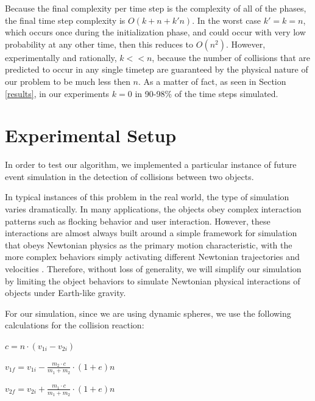 \documentclass[CEJCS,PDF]{cej} %
\begin{document}
Because the final complexity per time step is the complexity of all of the phases, the final time step complexity is $O(k+n+k'n)$.  In the worst case $k'=k=n$, which occurs once during the initialization phase, and could occur with 
very low probability at any other time, then this reduces to $O(n^2)$.  However, experimentally and rationally, $k << n$, because the number of collisions
that are predicted to occur in any single timetep are guaranteed by the physical nature of our problem to be much less then $n$.  As a matter of fact, as seen in Section \ref{results}, in our experiments
$k=0$ in 90-98\% of the time steps simulated.

\section{Experimental Setup}%

In order to test our algorithm, we implemented a particular instance of future event simulation in the detection of collisions between two objects.

In typical instances of this problem in the real world, the type of simulation varies dramatically. In many applications, the objects obey complex interaction patterns such as flocking behavior and user interaction.  However, these interactions are almost always built around a simple framework for simulation that obeys Newtonian physics as the primary motion characteristic, with the more complex
behaviors simply activating different Newtonian trajectories and velocities \cite{Jadbabaie02coordinationof}.  Therefore, without loss of generality, we will simplify our simulation by limiting the object behaviors to simulate Newtonian physical interactions of objects under Earth-like gravity.

For our simulation, since we are using dynamic spheres, we use the following calculations for the collision reaction\cite{wheatchex}:

\begin{math}
c = n \cdot (v_{1i} - v_{2i})
\end{math}

\begin{math}
v_{1f} = v_{1i} - \frac{m_2 \cdot c}{m_1 + m_2} \cdot (1 + e)n
\end{math}

\begin{math}
v_{2f} = v_{2i} + \frac{m_1 \cdot c}{m_1 + m_2} \cdot (1 + e)n
\end{math}
\end{document}
